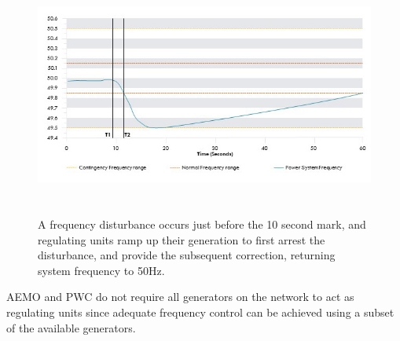 \documentclass[12pt, a4paper]{article}
\begin{document}
\begin{figure}[h]
\centering
\includegraphics[height=8cm]{frequency_arrest}
\caption{A frequency disturbance occurs just before the 10 second mark, and regulating units ramp up their generation to first arrest the disturbance, and provide the subsequent correction, returning system frequency to 50$\si{\hertz}$.}
\end{figure}

AEMO and PWC do not require all generators on the network to act as regulating units since adequate frequency control can be achieved using a subset of the available generators.
\end{document}

